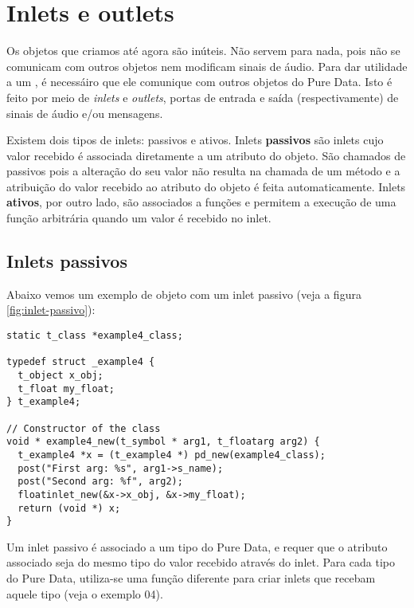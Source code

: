 
\chapter{Inlets e outlets}

Os objetos que criamos até agora são inúteis. Não servem para nada, pois não
se comunicam com outros objetos nem modificam sinais de áudio. Para dar
utilidade a um \external, é necessáiro que ele comunique com outros objetos
do Pure Data. Isto é feito por meio de \emph{inlets} e \emph{outlets}, portas
de entrada e saída (respectivamente) de sinais de áudio e/ou mensagens.

Existem dois tipos de inlets: passivos e ativos. Inlets \textbf{passivos} são
inlets cujo valor recebido é associada diretamente a um atributo do objeto.
São chamados de passivos pois a alteração do seu valor não resulta na chamada
de um método e a atribuição do valor recebido ao atributo do objeto é feita
automaticamente.  Inlets \textbf{ativos}, por outro lado, são associados a
funções e permitem a execução de uma função arbitrária quando um valor é
recebido no inlet.

\section{Inlets passivos}

Abaixo vemos um exemplo de objeto com um inlet passivo (veja a figura
\ref{fig:inlet-passivo}):

\begin{lstlisting}
static t_class *example4_class;

typedef struct _example4 {
  t_object x_obj;
  t_float my_float;
} t_example4;

// Constructor of the class
void * example4_new(t_symbol * arg1, t_floatarg arg2) {
  t_example4 *x = (t_example4 *) pd_new(example4_class);
  post("First arg: %s", arg1->s_name);
  post("Second arg: %f", arg2);
  floatinlet_new(&x->x_obj, &x->my_float);
  return (void *) x;
}
\end{lstlisting}

Um inlet passivo é associado a um tipo do Pure Data, e requer que o atributo
associado seja do mesmo tipo do valor recebido através do inlet. Para cada
tipo do Pure Data, utiliza-se uma função diferente para criar inlets que
recebam aquele tipo (veja o exemplo 04).

